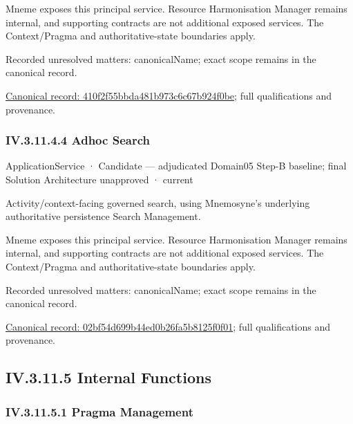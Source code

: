 Mneme exposes this principal service. Resource Harmonisation Manager remains internal, and supporting contracts are not additional exposed services. The Context/Pragma and authoritative-state boundaries apply.


{\small Recorded unresolved matters: canonicalName; exact scope remains in the canonical record.}\par
{\footnotesize \href{../../../../continuum/application/application-service/410f2f55bbda481b973c6c67b924f0be.md}{Canonical record: 410f2f55bbda481b973c6c67b924f0be}; full qualifications and provenance.}\par
\subsubsection*{IV.3.11.4.4 Adhoc Search}
\label{navigation:IV.3.11.4.4}

\label{element:02bf54d699b44ed0b26fa5b8125f0f01}
{\small ApplicationService · Candidate — adjudicated Domain05 Step-B baseline; final Solution Architecture unapproved · current}\par

Activity/context-facing governed search, using Mnemosyne's underlying authoritative persistence Search Management.



Mneme exposes this principal service. Resource Harmonisation Manager remains internal, and supporting contracts are not additional exposed services. The Context/Pragma and authoritative-state boundaries apply.


{\small Recorded unresolved matters: canonicalName; exact scope remains in the canonical record.}\par
{\footnotesize \href{../../../../continuum/application/application-service/02bf54d699b44ed0b26fa5b8125f0f01.md}{Canonical record: 02bf54d699b44ed0b26fa5b8125f0f01}; full qualifications and provenance.}\par
\subsection*{IV.3.11.5 Internal Functions}
\label{navigation:IV.3.11.5}

\subsubsection*{IV.3.11.5.1 Pragma Management}
\label{navigation:IV.3.11.5.1}

